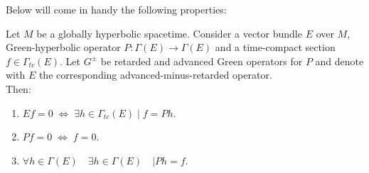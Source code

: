 \documentclass[Main]{subfiles}
\begin{document}
			Below will come in handy the following properties:
			\begin{proposition}\label{Prop:GreenKernel}
				Let $M$ be a globally hyperbolic spacetime. Consider a vector bundle $E$ over $M$, Green-hyperbolic operator $P: \Gamma(E)\rightarrow \Gamma(E)$ and a time-compact section $f\in \Gamma_{tc}(E)$.
				Let $G^\pm$ be retarded and advanced Green operators for $P$ and denote with $E$ the corresponding advanced-minus-retarded operator.\\
				Then:
					\begin{enumerate}
						\item $E f = 0 \; \Leftrightarrow \; \exists h \in \Gamma_{tc}(E) \; \vert \; f=P h $.
						\item $P f = 0 \; \Leftrightarrow \; f=0$.
						\item $\forall h \in \Gamma(E)\quad \exists h \in \Gamma(E)\quad \vert P h = f$.
					\end{enumerate}
			\end{proposition}
\end{document}
